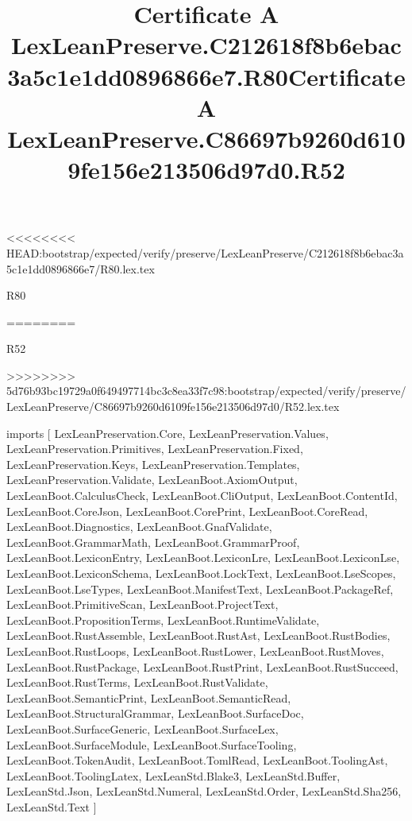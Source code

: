 <<<<<<<< HEAD:bootstrap/expected/verify/preserve/LexLeanPreserve/C212618f8b6ebac3a5c1e1dd0896866e7/R80.lex.tex
\begin{lexlean}{R80}
\title{Certificate A LexLeanPreserve.C212618f8b6ebac3a5c1e1dd0896866e7.R80}
========
\begin{lexlean}{R52}
\title{Certificate A LexLeanPreserve.C86697b9260d6109fe156e213506d97d0.R52}
>>>>>>>> 5d76b93bc19729a0f649497714bc3c8ea33f7c98:bootstrap/expected/verify/preserve/LexLeanPreserve/C86697b9260d6109fe156e213506d97d0/R52.lex.tex
\begin{coremodule}
imports [
  LexLeanPreservation.Core,
  LexLeanPreservation.Values,
  LexLeanPreservation.Primitives,
  LexLeanPreservation.Fixed,
  LexLeanPreservation.Keys,
  LexLeanPreservation.Templates,
  LexLeanPreservation.Validate,
  LexLeanBoot.AxiomOutput,
  LexLeanBoot.CalculusCheck,
  LexLeanBoot.CliOutput,
  LexLeanBoot.ContentId,
  LexLeanBoot.CoreJson,
  LexLeanBoot.CorePrint,
  LexLeanBoot.CoreRead,
  LexLeanBoot.Diagnostics,
  LexLeanBoot.GnafValidate,
  LexLeanBoot.GrammarMath,
  LexLeanBoot.GrammarProof,
  LexLeanBoot.LexiconEntry,
  LexLeanBoot.LexiconLre,
  LexLeanBoot.LexiconLse,
  LexLeanBoot.LexiconSchema,
  LexLeanBoot.LockText,
  LexLeanBoot.LseScopes,
  LexLeanBoot.LseTypes,
  LexLeanBoot.ManifestText,
  LexLeanBoot.PackageRef,
  LexLeanBoot.PrimitiveScan,
  LexLeanBoot.ProjectText,
  LexLeanBoot.PropositionTerms,
  LexLeanBoot.RuntimeValidate,
  LexLeanBoot.RustAssemble,
  LexLeanBoot.RustAst,
  LexLeanBoot.RustBodies,
  LexLeanBoot.RustLoops,
  LexLeanBoot.RustLower,
  LexLeanBoot.RustMoves,
  LexLeanBoot.RustPackage,
  LexLeanBoot.RustPrint,
  LexLeanBoot.RustSucceed,
  LexLeanBoot.RustTerms,
  LexLeanBoot.RustValidate,
  LexLeanBoot.SemanticPrint,
  LexLeanBoot.SemanticRead,
  LexLeanBoot.StructuralGrammar,
  LexLeanBoot.SurfaceDoc,
  LexLeanBoot.SurfaceGeneric,
  LexLeanBoot.SurfaceLex,
  LexLeanBoot.SurfaceModule,
  LexLeanBoot.SurfaceTooling,
  LexLeanBoot.TokenAudit,
  LexLeanBoot.TomlRead,
  LexLeanBoot.ToolingAst,
  LexLeanBoot.ToolingLatex,
  LexLeanStd.Blake3,
  LexLeanStd.Buffer,
  LexLeanStd.Json,
  LexLeanStd.Numeral,
  LexLeanStd.Order,
  LexLeanStd.Sha256,
  LexLeanStd.Text
]


\end{coremodule}
\end{lexlean}
\end{lexlean}
